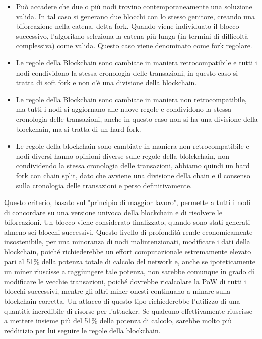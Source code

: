 \begin{itemize}
\item Può accadere che due o più nodi trovino contemporaneamente una soluzione valida. In tal caso si generano due blocchi con lo stesso genitore, creando una biforcazione nella catena, detta fork. Quando viene individuato il blocco successivo, l’algoritmo seleziona la catena più lunga (in termini di difficoltà complessiva) come valida. Questo caso viene denominato come fork regolare.
\item Le regole della Blockchain sono cambiate in maniera retrocompatibile e tutti i nodi condividono la stessa cronologia delle transazioni, in questo caso si tratta di soft fork e non c’è una divisione della blockchain.
\item Le regole della Blockchain sono cambiate in maniera non retrocompatibile, ma tutti i nodi si aggiornano alle nuove regole e condividono la stessa cronologia delle transazioni, anche in questo caso non si ha una divisione della blockchain, ma si tratta di un hard fork.
\item Le regole della blockchain sono cambiate in maniera non retrocompatibile e nodi diversi hanno opinioni diverse sulle regole della blolckchain, non condividendo la stessa cronologia delle transazioni, abbiamo quindi un hard fork con chain split, dato che avviene una divisione della chain e il consenso sulla cronologia delle transazioni e perso definitivamente.
\end{itemize}
Questo criterio, basato sul "principio di maggior lavoro", permette a tutti i nodi di concordare su una versione univoca della blockchain e di risolvere le biforcazioni. Un blocco viene considerato finalizzato, quando sono stati generati almeno sei blocchi successivi. Questo livello di profondità rende economicamente insostenibile, per una minoranza di nodi malintenzionati, modificare i dati della blockchain, poiché richiederebbe un effort computazionale estremamente elevato pari al 51\% della potenza totale di calcolo del network e, anche se ipoteticamente un miner riuscisse a raggiungere tale potenza, non sarebbe comunque in grado di modificare le vecchie transazioni, poiché dovrebbe ricalcolare la PoW di tutti i blocchi successivi, mentre gli altri miner onesti continuano a minare sulla blockchain corretta. Un attacco di questo tipo richiederebbe l’utilizzo di una quantità incredibile di risorse per l’attacker. Se qualcuno effettivamente riuscisse a mettere insieme più del 51\% della potenza di calcolo, sarebbe molto più redditizio per lui seguire le regole della blockchain.
